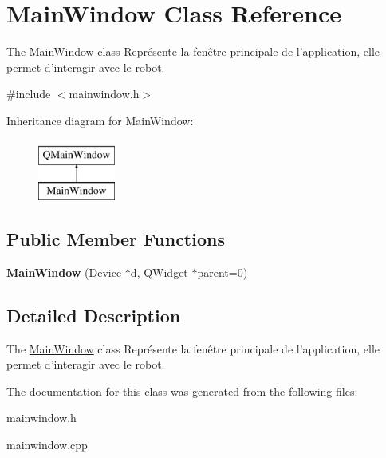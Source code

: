 \hypertarget{classMainWindow}{\section{Main\-Window Class Reference}
\label{classMainWindow}
}


The \hyperlink{classMainWindow}{Main\-Window} class Représente la fenêtre principale de l'application, elle permet d'interagir avec le robot.  




{\ttfamily \#include $<$mainwindow.\-h$>$}

Inheritance diagram for Main\-Window\-:\begin{figure}[H]
\begin{center}
\leavevmode
\includegraphics[height=2.000000cm]{classMainWindow}
\end{center}
\end{figure}
\subsection*{Public Member Functions}
\begin{DoxyCompactItemize}
\item 
\hypertarget{classMainWindow_a14be979a081e12f49bd8d62986d6d65e}{{\bfseries Main\-Window} (\hyperlink{classDevice}{Device} $\ast$d, Q\-Widget $\ast$parent=0)}\label{classMainWindow_a14be979a081e12f49bd8d62986d6d65e}

\end{DoxyCompactItemize}


\subsection{Detailed Description}
The \hyperlink{classMainWindow}{Main\-Window} class Représente la fenêtre principale de l'application, elle permet d'interagir avec le robot. 

The documentation for this class was generated from the following files\-:\begin{DoxyCompactItemize}
\item 
mainwindow.\-h\item 
mainwindow.\-cpp\end{DoxyCompactItemize}
